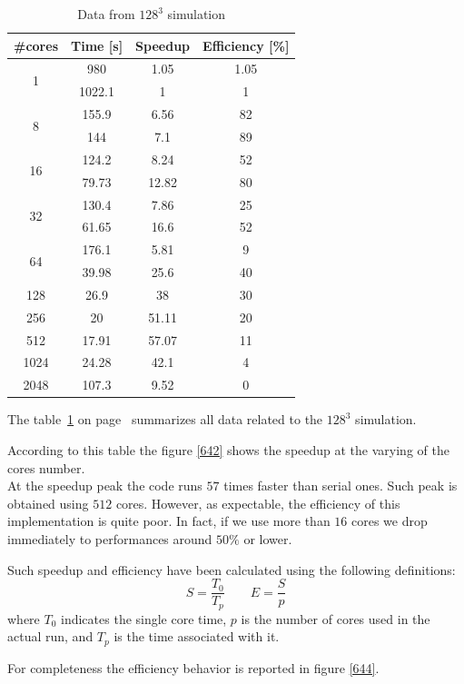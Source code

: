 \begin{table}[h]
\caption{Data from $128^{3}$ simulation}
\begin{center}
\begin{tabular}{c c c c}
\toprule
\textbf{\#cores} & \textbf{Time [s]} & \textbf{Speedup} & \textbf{Efficiency [\%]} \\
\midrule
\multirow{2}{*}{1} & 980 & 1.05 & 1.05 \\
& 1022.1 & 1 & 1 \\
\hline
\multirow{2}{*}{8} & 155.9 & 6.56 & 82 \\
& 144 & 7.1 & 89 \\
\hline
\multirow{2}{*}{16} & 124.2 & 8.24 & 52 \\
& 79.73 & 12.82 & 80 \\
\hline
\multirow{2}{*}{32} & 130.4 & 7.86 & 25 \\
& 61.65 & 16.6 & 52 \\
\hline
\multirow{2}{*}{64} & 176.1 & 5.81 & 9 \\
& 39.98 & 25.6 & 40 \\
\hline
128 & 26.9 & 38 & 30 \\

256 & 20 & 51.11 & 20 \\

512 & 17.91 & 57.07 & 11 \\

1024 & 24.28 & 42.1 & 4 \\

2048 & 107.3 & 9.52 & 0 \\
\bottomrule
\end{tabular}
\end{center}
\label{64data}
\end{table}%


The table~\ref{64data} on page~\pageref{64data} summarizes all data related to the $128^{3}$ simulation. 


\par
According to this table the figure \ref{642} shows the speedup at the varying of the cores number. \\
At the speedup peak the code runs $57$ times faster than serial ones. Such peak is obtained using $512$ cores. However, as expectable, the efficiency of this implementation is quite poor. In fact, if we use more than $16$ cores we drop immediately to performances around $50\%$ or lower. 
\par
Such speedup and efficiency have been calculated using the following definitions:
\[
S = \frac{T_{0}}{T_{p}} \quad \quad E = \frac{S}{p}
\]
where $T_{0}$ indicates the single core time, $p$ is the number of cores used in the actual run, and $T_{p}$ is the time associated with it. \\
\par
For completeness the efficiency behavior is reported in figure \ref{644}.

